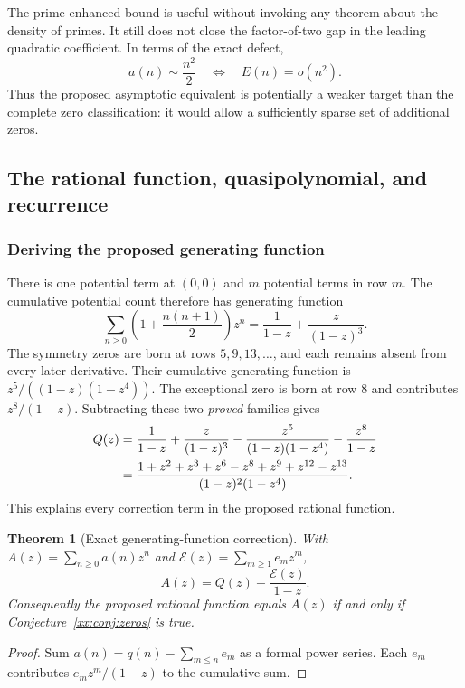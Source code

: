 \documentclass[11pt,a4paper]{article}
\numberwithin{equation}{section}
\newtheorem{theorem}{Theorem}[section]
\theoremstyle{definition}
\theoremstyle{remark}
\theoremstyle{plain}
\begin{document}
The prime-enhanced bound is useful without invoking any theorem about the
density of primes. It still does not close the factor-of-two gap in the
leading quadratic coefficient. In terms of the exact defect,
\begin{equation}\label{xx:eq:asympeq}
 a(n)\sim\frac{n^2}{2}\quad\Longleftrightarrow\quad E(n)=o(n^2).
\end{equation}
Thus the proposed asymptotic equivalent is potentially a weaker target than
the complete zero classification: it would allow a sufficiently sparse set
of additional zeros.

\subsection{The rational function, quasipolynomial, and recurrence}\label{xx:sec:gf}

\subsubsection{Deriving the proposed generating function}
There is one potential term at $(0,0)$ and $m$ potential terms in row $m$.
The cumulative potential count therefore has generating function
\[
 \sum_{n\ge0}\left(1+\frac{n(n+1)}2\right)z^n
 =\frac1{1-z}+\frac{z}{(1-z)^3}.
\]
The symmetry zeros are born at rows $5,9,13,\ldots$, and each remains
absent from every later derivative. Their cumulative generating function is
$z^5/((1-z)(1-z^4))$. The exceptional zero is born at row $8$ and
contributes $z^8/(1-z)$. Subtracting these two \emph{proved} families gives
\begin{align}
 Q(z)
 &=\frac1{1-z}+\frac{z}{(1-z)^3}
       -\frac{z^5}{(1-z)(1-z^4)}-\frac{z^8}{1-z}\notag\\
 &=\frac{1+z^2+z^3+z^6-z^8+z^9+z^{12}-z^{13}}
        {(1-z)^2(1-z^4)}.\label{xx:eq:gfderive}
\end{align}
This explains every correction term in the proposed rational function.

\begin{theorem}[Exact generating-function correction]\label{xx:thm:gfdefect}
With $A(z)=\sum_{n\ge0}a(n)z^n$ and
$\mathcal E(z)=\sum_{m\ge1}e_m z^m$,
\begin{equation}\label{xx:eq:gfdefect}
 A(z)=Q(z)-\frac{\mathcal E(z)}{1-z}.
\end{equation}
Consequently the proposed rational function equals $A(z)$ if and only if
Conjecture~\ref{xx:conj:zeros} is true.
\end{theorem}
\begin{proof}
Sum $a(n)=q(n)-\sum_{m\le n}e_m$ as a formal power series. Each $e_m$
contributes $e_mz^m/(1-z)$ to the cumulative sum.
\end{proof}
\end{document}

